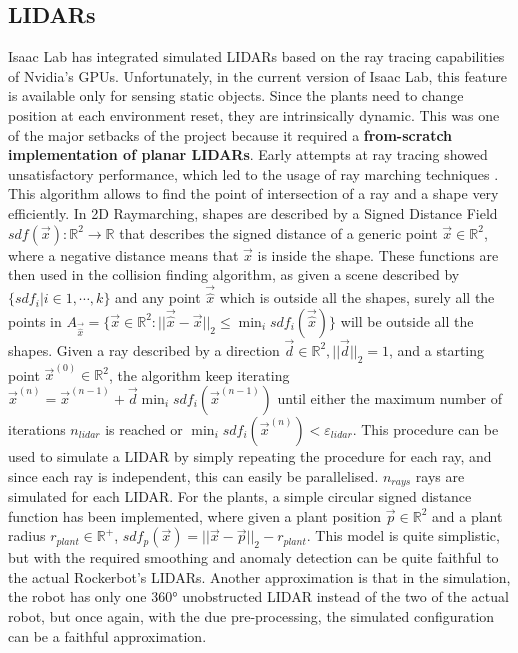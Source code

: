 \documentclass[11pt,a4paper,twocolumn]{article}
\begin{document}
\subsection{LIDARs}
Isaac Lab has integrated simulated LIDARs based on the ray tracing capabilities of Nvidia's GPUs. Unfortunately, in the current version 
of Isaac Lab, this feature is available only for sensing static objects. Since the plants need to change position at each environment reset, they are intrinsically dynamic. This was one of the major setbacks of the project because it required a \textbf{from-scratch implementation of planar LIDARs}. Early attempts at ray tracing showed unsatisfactory performance, which led to the usage of ray marching techniques \cite{Raymarching}. This algorithm allows to find the point of intersection of a ray and a shape very efficiently.  In 2D Raymarching, shapes are described by a Signed Distance Field $sdf(\vec{x}):\mathbb{R}^2\to\mathbb{R}$ that describes the signed distance of a generic point $\vec{x} \in \mathbb{R}^2$, where a negative distance means that $\vec{x}$ is inside the shape. These functions are then used in the collision finding algorithm, as given a scene described by $\{sdf_i|i\in{1, \cdots, k}\}$ and any point $\vec{\hat{x}}$ which is outside all the shapes, surely all the points in $A_{\vec{\hat{x}}} = \{\vec{x}\in\mathbb{R}^2: ||\vec{\hat{x}}-\vec{x}||_2 \leq \min_{i}sdf_i(\vec{\hat{x}}) \}$ will be outside all the shapes. Given a ray described by a direction $\vec{d}\in\mathbb{R}^2, ||\vec{d}||_2 = 1$, and a starting point $\vec{x}^{(0)} \in \mathbb{R}^2$, the algorithm keep iterating $\vec{x}^{(n)} = \vec{x}^{(n-1)} + \vec{d} \min_{i}sdf_i(\vec{x}^{(n-1)})$ until either the maximum number of iterations $n_{lidar}$ is reached or $\min_{i}sdf_i(\vec{x}^{(n)})<\varepsilon_{lidar}$. This procedure can be used to simulate a LIDAR by simply repeating the procedure for each ray, and since each ray is independent, this can easily be parallelised. $n_{rays}$ rays are simulated for each LIDAR. For the plants, a simple circular signed distance function has been implemented, where given a plant position $\vec{p} \in \mathbb{R}^2$ and a plant radius $r_{plant} \in \mathbb{R}^+$, $sdf_p(\vec{x})=||\vec{x} - \vec{p} ||_2 - r_{plant}$. This model is quite simplistic, but with the required smoothing and anomaly detection can be quite faithful to the actual Rockerbot's LIDARs. Another approximation is that in the simulation, the robot has only one 360° unobstructed LIDAR instead of the two of the actual robot, but once again, with the due pre-processing, the simulated configuration can be a faithful approximation.
\end{document}
